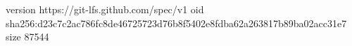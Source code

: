 version https://git-lfs.github.com/spec/v1
oid sha256:d23c7c2ac786fc8de46725723d76b8f5402e8fdba62a263817b89ba02acc31e7
size 87544
